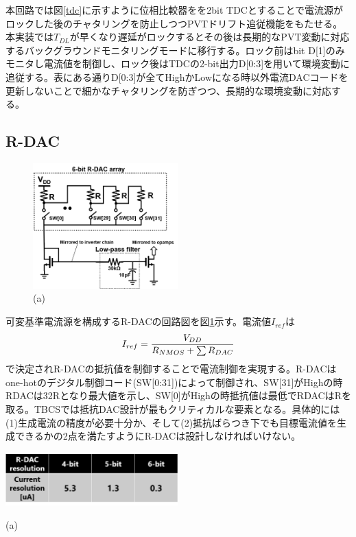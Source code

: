 \documentclass[letterpaper, 10 pt, conference]{ieeeconf}  %
\begin{document}
本回路では図\ref{tdc}に示すように位相比較器をを2bit TDCとすることで電流源がロックした後のチャタリングを防止しつつPVTドリフト追従機能をもたせる。
本実装では$T_{DL}$が早くなり遅延がロックするとその後は長期的なPVT変動に対応するバックグラウンドモニタリングモードに移行する。ロック前はbit D[1]のみモニタし電流値を制御し、ロック後はTDCの2-bit出力D[0:3]を用いて環境変動に追従する。表にある通りD[0:3]が全てHighかLowになる時以外電流DACコードを更新しないことで細かなチャタリングを防ぎつつ、長期的な環境変動に対応する。

\subsection{R-DAC}
\begin{figure}[!]
\centering
 \includegraphics[width=0.5\textwidth]{figs/rdac.png}
  \caption{(a) 
}
\label{rdac_sche}
\end{figure}
可変基準電流源を構成するR-DACの回路図を図\ref{rdac_sche}示す。電流値$I_{ref}$は
\begin{eqnarray}
    \centering
     I_{ref} = \frac{V_{DD}}{R_{NMOS}+\sum R_{DAC}}
    \label{iref_eq}
\end{eqnarray}
で決定されR-DACの抵抗値を制御することで電流制御を実現する。R-DACはone-hotのデジタル制御コード(SW[0:31])によって制御され、SW[31]がHighの時RDACは32Rとなり最大値を示し、SW[0]がHighの時抵抗値は最低でRDACはRを取る。TBCSでは抵抗DAC設計が最もクリティカルな要素となる。具体的には(1)生成電流の精度が必要十分か、そして(2)抵抗ばらつき下でも目標電流値を生成できるかの2点を満たすようにR-DACは設計しなければいけない。

\begin{table}[]
\centering
 \includegraphics[width=0.5\textwidth]{figs/rdac_table.png}
  \caption{(a) 
}
\label{rdac_table}
\end{table}
\end{document}
